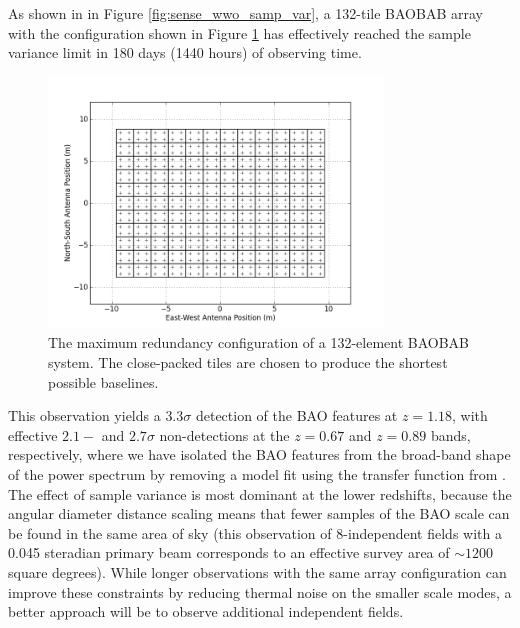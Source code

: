 \documentclass[10pt,iop]{emulateapj}
\begin{document}
As shown in in Figure \ref{fig:sense_wwo_samp_var}, a 132-tile BAOBAB array with the configuration
shown in Figure \ref{fig:antpos128} has effectively reached
the sample variance limit in 180 days (1440 hours) of observing time.  
\begin{figure}\centering
\includegraphics[width=3.5in]{antpos128-2.png}
\caption{The maximum redundancy configuration of a 132-element BAOBAB system.  The close-packed
tiles are chosen to produce the shortest possible baselines.
} \label{fig:antpos128}
\end{figure}
This observation yields a $3.3\sigma$ detection of the BAO features at $z = 1.18$, 
with effective $2.1-$ and $2.7\sigma$ non-detections at the $z = 0.67$ and $z = 0.89$ bands,
respectively, where we have isolated the BAO features from the broad-band shape of the
power spectrum by removing a model fit using the transfer function from
\citet{eisenstein_and_hu_1998}.
The effect of sample variance is most dominant at the lower redshifts, 
because the angular diameter distance scaling means that fewer samples of the BAO scale can be
found in the same area of sky (this observation of 8-independent fields with a
0.045 steradian primary beam corresponds to an effective survey area of $\sim 1200$ square degrees).
While longer observations with the same array configuration can improve these constraints
by reducing thermal noise on the smaller scale modes, a
better approach will be to observe additional independent fields.
\end{document}
